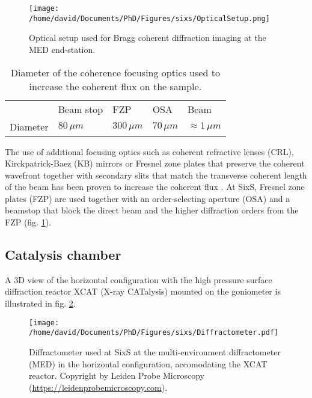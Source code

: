 \begin{figure}[!htb]
    \centering
    \texttt{[image: /home/david/Documents/PhD/Figures/sixs/OpticalSetup.png]}
    \caption{
    	Optical setup used for Bragg coherent diffraction imaging at the MED end-station.
    }
    \label{fig:OpticalSetup}
\end{figure}

\begin{table}[!htb]
    \centering
	\begin{tabular}{l|l|l|l|l}
	     & Beam stop & FZP & OSA & Beam\\ \hfill
	    Diameter & $80 \, \mu m$ & $300 \, \mu m$ & $70 \, \mu m$ & $\approx 1 \, \mu m$\\
	\end{tabular}
	\caption{
	Diameter of the coherence focusing optics used to increase the coherent flux on the sample.
	}
    \label{tab:OpticsBCDI}
\end{table}

The use of additional focusing optics such as coherent refractive lenses (CRL), Kirckpatrick-Baez (KB) mirrors or Fresnel zone plates that preserve the coherent wavefront together with secondary slits that match the transverse coherent length of the beam has been proven to increase the coherent flux \parencite{Schroer2008, diaz_coherent_2009, Mastropietro2011}.
At SixS, Fresnel zone plates (FZP) are used together with an order-selecting aperture (OSA) and a beamstop that block the direct beam and the higher diffraction orders from the FZP (fig. \ref{fig:OpticalSetup}).

\subsection{Catalysis chamber}

A 3D view of the horizontal configuration with the high pressure surface diffraction reactor XCAT (X-ray CATalysis) mounted on the goniometer is illustrated in fig. \ref{fig:MEDDiffractometer}.

\begin{figure}[!htb]
    \centering
    \texttt{[image: /home/david/Documents/PhD/Figures/sixs/Diffractometer.pdf]}
    \caption{
    	Diffractometer used at SixS at the multi-environment diffractometer (MED) in the horizontal configuration, accomodating the XCAT reactor.
    	Copyright by Leiden Probe Microscopy (\url{https://leidenprobemicroscopy.com}).
    }
    \label{fig:MEDDiffractometer}
\end{figure}

